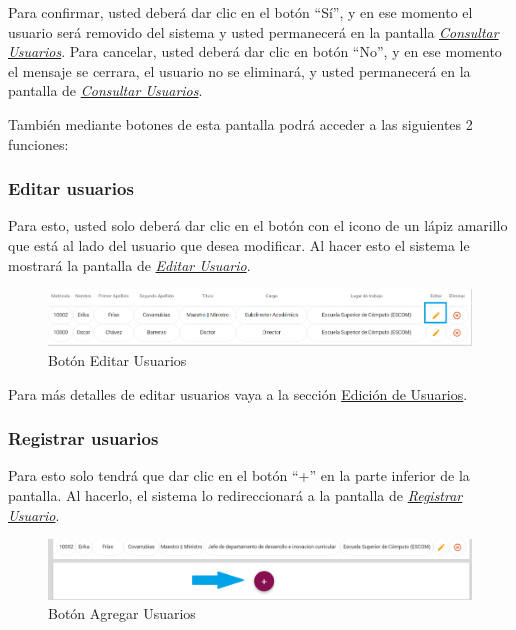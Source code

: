 \begin{enumerate}
\begin{figure}[H]
                \end{figure}

                Para confirmar, usted deberá dar clic en el botón “Sí”, y en ese momento el usuario será removido del sistema y usted permanecerá en la pantalla \hyperlink{consultarUs}{\textit{Consultar Usuarios}}.
                Para cancelar, usted deberá dar clic en botón “No”, y en ese momento el mensaje se cerrara, el usuario no se eliminará, y usted permanecerá en la pantalla de \hyperlink{consultarUs}{\textit{Consultar Usuarios}}.

        \end{enumerate}

        También mediante botones de esta pantalla podrá acceder a las siguientes 2 funciones:

        \subsubsection{Editar usuarios}

            Para esto, usted solo deberá dar clic en el botón con el icono de un lápiz amarillo que está al lado del usuario que desea modificar. Al hacer esto el sistema le mostrará la pantalla   de \hyperlink{editarUs}{\textit{Editar Usuario}}.

            \begin{figure}[H]
                \centering
                \hypertarget{editar}{\includegraphics[width=0.7\linewidth]{images/SP5/BtnEditar}}
                \caption{Botón Editar Usuarios}
                \label{editar}
            \end{figure}

            Para más detalles de editar usuarios vaya a la sección \hyperlink{editar-user}{Edición de Usuarios}.

        \subsubsection{Registrar  usuarios}

            Para esto solo tendrá que dar clic en el botón “+” en la parte inferior de la pantalla. Al hacerlo, el sistema  lo redireccionará a la pantalla de \hyperlink{registrarUs}{\textit{Registrar Usuario}}.

            \begin{figure}[H]
                \centering
                \hypertarget{add}{\includegraphics[width=0.7\linewidth]{images/SP5/BtnAgregar}}
                \caption{Botón Agregar Usuarios}
                \label{add}
            \end{figure}

